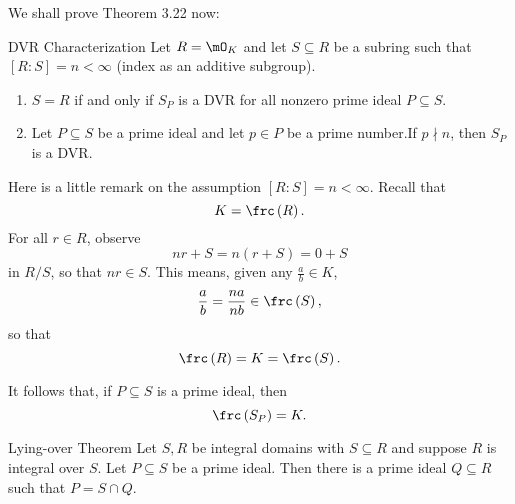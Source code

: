 \documentclass[pmath441]{subfiles}
\begin{document}
    \np We shall prove Theorem 3.22 now:

    \setcounter{stcounter}{21}
    \begin{theorem}{DVR Characterization}
        Let $R=\mO_K$ and let $S\subseteq R$ be a subring such that $\left[ R:S \right] = n < \infty$ (index as an additive subgroup).
        \begin{enumerate}
            \item $S=R$ if and only if $S_P$ is a DVR for all nonzero prime ideal $P\subseteq S$.
            \item Let $P\subseteq S$ be a prime ideal and let $p\in P$ be a prime number.\footnotemark[1] If $p\nmid n$, then $S_P$ is a DVR.
        \end{enumerate}
        
        \noindent
        \begin{minipage}{\textwidth}
        \end{minipage}
    \end{theorem}
    \setcounter{stcounter}{23}
    
    \rruleline
    
    \np Here is a little remark on the assumption $\left[ R:S \right] = n < \infty$. Recall that
    \begin{equation*}
        K = \frc\left( R \right).
    \end{equation*}
    For all $r\in R$, observe
    \begin{equation*}
        nr+S = n\left( r+S \right) = 0+S
    \end{equation*}
    in $R /S$, so that $nr\in S$. This means, given any $\frac{a}{b}\in K$,
    \begin{equation*}
        \frac{a}{b} = \frac{na}{nb}\in\frc\left( S \right),
    \end{equation*}
    so that
    \begin{equation*}
        \frc\left( R \right) = K = \frc\left( S \right).
    \end{equation*}

    It follows that, if $P\subseteq S$ is a prime ideal, then
    \begin{equation*}
        \frc\left( S_P \right) = K.
    \end{equation*}

    \begin{lemma}{Lying-over Theorem}
        Let $S,R$ be integral domains with $S\subseteq R$ and suppose $R$ is integral over $S$. Let $P\subseteq S$ be a prime ideal. Then there is a prime ideal $Q\subseteq R$ such that $P=S\cap Q$.
    \end{lemma}
    
\end{document}
